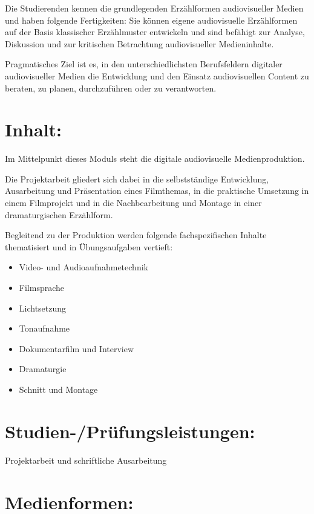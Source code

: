 Die Studierenden kennen die grundlegenden Erzählformen audiovisueller
Medien und haben folgende Fertigkeiten: Sie können eigene audiovisuelle
Erzählformen auf der Basis klassischer Erzählmuster entwickeln und sind
befähigt zur Analyse, Diskussion und zur kritischen Betrachtung
audiovisueller Medieninhalte.

Pragmatisches Ziel ist es, in den unterschiedlichsten Berufsfeldern
digitaler audiovisueller Medien die Entwicklung und den Einsatz
audiovisuellen Content zu beraten, zu planen, durchzuführen oder zu
verantworten.

\section*{Inhalt:}\label{inhalt-2}

Im Mittelpunkt dieses Moduls steht die digitale audiovisuelle
Medienproduktion.

Die Projektarbeit gliedert sich dabei in die selbstständige Entwicklung,
Ausarbeitung und Präsentation eines Filmthemas, in die praktische
Umsetzung in einem Filmprojekt und in die Nachbearbeitung und Montage in
einer dramaturgischen Erzählform.

Begleitend zu der Produktion werden folgende fachspezifischen Inhalte
thematisiert und in Übungsaufgaben vertieft:

\begin{itemize}
\item
  Video- und Audioaufnahmetechnik
\item
  Filmsprache
\item
  Lichtsetzung
\item
  Tonaufnahme
\item
  Dokumentarfilm und Interview
\item
  Dramaturgie
\item
  Schnitt und Montage
\end{itemize}

\section*{Studien-/Prüfungsleistungen:}\label{studien-pruxfcfungsleistungen}

Projektarbeit und schriftliche Ausarbeitung

\section*{Medienformen:}\label{medienformen}

